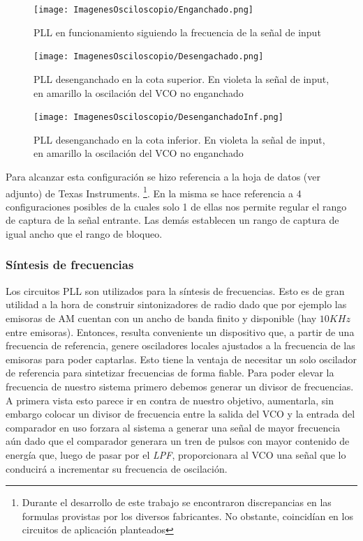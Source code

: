 \begin{figure}[H]
	\centering
	\texttt{[image: ImagenesOsciloscopio/Enganchado.png]}
	\caption{PLL en funcionamiento siguiendo la frecuencia de la señal de input}
	\label{PLLENGANCHADO1}
\end{figure}



\begin{figure}[H]
	\centering
	\texttt{[image: ImagenesOsciloscopio/Desengachado.png]}
	\caption{PLL desenganchado en la cota superior. En violeta la señal de input, en amarillo la oscilación del VCO no enganchado}
	\label{PLLDESENGANCHADO1}
\end{figure}

\begin{figure}[H]
	\centering
	\texttt{[image: ImagenesOsciloscopio/DesenganchadoInf.png]}
	\caption{PLL desenganchado en la cota inferior. En violeta la señal de input, en amarillo la oscilación del VCO no enganchado}
	\label{PLLDESENGANCHADO1}
\end{figure}






Para alcanzar esta configuración se hizo referencia a la hoja de datos (ver adjunto) de Texas Instruments. \footnote{Durante el desarrollo de este trabajo se encontraron discrepancias en las formulas provistas por los diversos fabricantes. No obstante, coincidían en los circuitos de aplicación planteados}.
En la misma se hace referencia a 4 configuraciones posibles de la cuales solo 1 de ellas nos permite regular el rango de captura de la señal entrante. Las demás establecen un rango de captura de igual ancho que el rango de bloqueo.


\subsubsection{Síntesis de frecuencias}
Los circuitos PLL son utilizados para la síntesis de frecuencias. Esto es de gran utilidad a la hora de construir sintonizadores de radio dado que por ejemplo las emisoras de AM cuentan con un ancho de banda finito y disponible (hay $10KHz$ entre emisoras). Entonces, resulta conveniente un dispositivo que, a partir de una frecuencia de referencia, genere osciladores locales ajustados a la frecuencia de las emisoras para poder captarlas. Esto tiene la ventaja de necesitar un solo oscilador de referencia para sintetizar frecuencias de forma fiable.
Para poder elevar la frecuencia de nuestro sistema primero debemos generar un divisor de frecuencias. A primera vista esto parece ir en contra de nuestro objetivo, aumentarla, sin embargo colocar un divisor de frecuencia entre la salida del VCO y la entrada del comparador en uso forzara al sistema a generar una señal de mayor frecuencia aún dado que el comparador generara un tren de pulsos con mayor contenido de energía que, luego de pasar por el \emph{LPF}, proporcionara al VCO una señal que lo conducirá a incrementar su frecuencia de oscilación.

